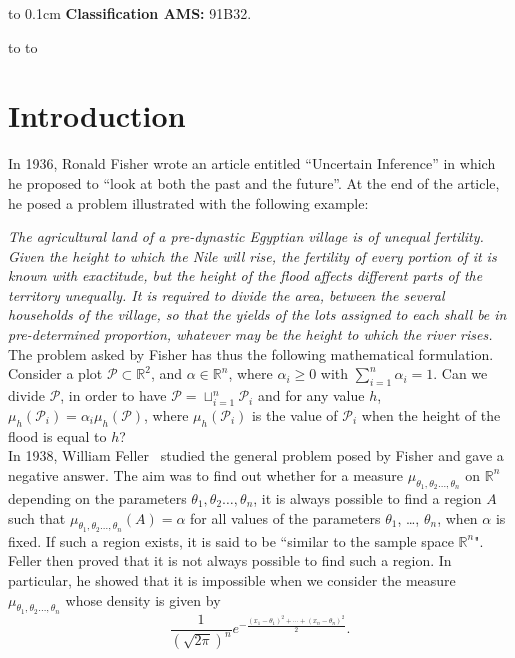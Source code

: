 \documentclass[A4paper, 12pt]{article}
\def\cP{\mathcal{P}}
\def\RR{{\mathbb{R}}}
\begin{document}
\smallskip

\noindent \hphantom{x}\hbox to 0.1cm{\hfill}{\small
  \textbf{Classification AMS:} {91B32}.}
\eject


\hbox to
\hbox to
\bigskip

\section*{Introduction}
In 1936, Ronald Fisher wrote an article entitled ``Uncertain
Inference'' \cite{Fisher} in which he proposed to ``look at both the
past and the future''. At the end of the article, he posed a problem
illustrated with the following example:


\emph{The agricultural land of a pre-dynastic Egyptian village is of
unequal fertility.  Given the height to which the Nile will rise, the
fertility of every portion of it is known with exactitude, but the
height of the flood affects different parts of the territory
unequally.  It is required to divide the area, between the several
households of the village, so that the yields of the lots assigned to
each shall be in pre-determined proportion, whatever may be the height
to which the river rises.}\\


The problem asked by Fisher has thus the following mathematical formulation.\\
Consider a plot $\mathcal{P} \subset \RR^2$, and  $\alpha\in\RR^{n}$,
where $\alpha_{i} \geq 0$ with $\sum_{i=1}^n \alpha_{i}=1$.  Can we divide $\cP$, in order to have $\cP=\sqcup_{i=1}^n \cP_{i}$ and  for any value $h$, $\mu_{h}(\cP_{i})=\alpha_{i} \mu_{h}(\cP)$, where
$\mu_{h}(\cP_{i})$ is the value of $\cP_{i}$ when the height of the
flood is equal to $h$?\\

In 1938, William Feller~\cite{Feller} studied the general problem posed by Fisher and
gave a negative answer. The aim was to find out
whether for a measure $\mu_{\theta_1, \theta_2 \ldots, \theta_n}$ on
$\RR^n$ depending on the parameters $\theta_1, \theta_2 \ldots,
\theta_n$, it is always possible to find a region $A$ such that
$\mu_{\theta_1, \theta_2 \ldots, \theta_n}(A)=\alpha$ for all values
of the parameters $\theta_1$, \ldots, $\theta_n$, when $\alpha$ is
fixed. If such a region exists, it is said to be ``similar to the
sample space $\RR^n$". Feller then proved that it is not always
possible to find such a region. In particular, he showed that it is
impossible when we consider the measure $\mu_{\theta_1, \theta_2
  \ldots, \theta_n}$ whose density is given by
$$\dfrac{1}{(\sqrt{2\pi})^n}e^{-\frac{(x_1-\theta_1)^2+\cdots+(x_n-\theta_n)^2}{2}}.$$
\end{document}
